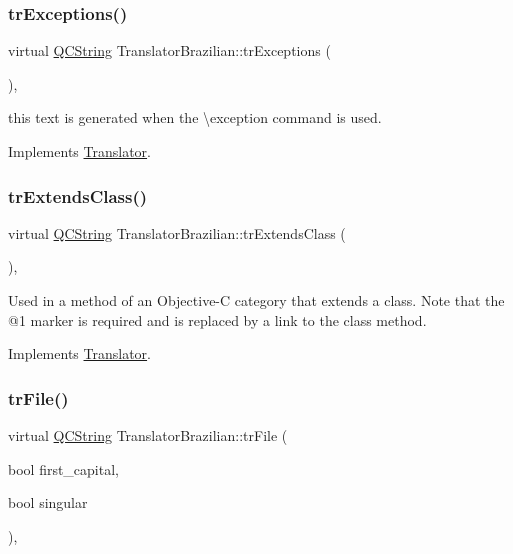 \subsubsection{\texorpdfstring{trExceptions()}{trExceptions()}}
{\footnotesize\ttfamily virtual \mbox{\hyperlink{class_q_c_string}{Q\+C\+String}} Translator\+Brazilian\+::tr\+Exceptions (\begin{DoxyParamCaption}{ }\end{DoxyParamCaption})\hspace{0.3cm}{\ttfamily [inline]}, {\ttfamily [virtual]}}

this text is generated when the \textbackslash{}exception command is used. 

Implements \mbox{\hyperlink{class_translator}{Translator}}.

\mbox{\label{class_translator_brazilian_a87384ac8f144a958037bbca3dad34ef8}} 
\subsubsection{\texorpdfstring{trExtendsClass()}{trExtendsClass()}}
{\footnotesize\ttfamily virtual \mbox{\hyperlink{class_q_c_string}{Q\+C\+String}} Translator\+Brazilian\+::tr\+Extends\+Class (\begin{DoxyParamCaption}{ }\end{DoxyParamCaption})\hspace{0.3cm}{\ttfamily [inline]}, {\ttfamily [virtual]}}

Used in a method of an Objective-\/C category that extends a class. Note that the @1 marker is required and is replaced by a link to the class method. 

Implements \mbox{\hyperlink{class_translator}{Translator}}.

\mbox{\label{class_translator_brazilian_af2bb95fd2ebcaacb42d12ceffaf6cb6f}} 
\subsubsection{\texorpdfstring{trFile()}{trFile()}}
{\footnotesize\ttfamily virtual \mbox{\hyperlink{class_q_c_string}{Q\+C\+String}} Translator\+Brazilian\+::tr\+File (\begin{DoxyParamCaption}\item[{bool}]{first\+\_\+capital,  }\item[{bool}]{singular }\end{DoxyParamCaption})\hspace{0.3cm}{\ttfamily [inline]}, {\ttfamily [virtual]}}

